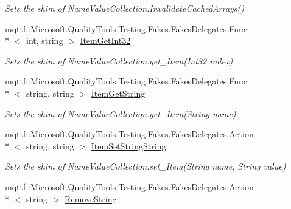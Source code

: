 \begin{DoxyCompactItemize}
\begin{DoxyCompactList}\small\item\em Sets the shim of Name\-Value\-Collection.\-Invalidate\-Cached\-Arrays()\end{DoxyCompactList}\item 
mqttf\-::\-Microsoft.\-Quality\-Tools.\-Testing.\-Fakes.\-Fakes\-Delegates.\-Func\\*
$<$ int, string $>$ \hyperlink{class_system_1_1_collections_1_1_specialized_1_1_fakes_1_1_shim_name_value_collection_a494ff3556795999db78086c4a188471c}{Item\-Get\-Int32}
\begin{DoxyCompactList}\small\item\em Sets the shim of Name\-Value\-Collection.\-get\-\_\-\-Item(\-Int32 index)\end{DoxyCompactList}\item 
mqttf\-::\-Microsoft.\-Quality\-Tools.\-Testing.\-Fakes.\-Fakes\-Delegates.\-Func\\*
$<$ string, string $>$ \hyperlink{class_system_1_1_collections_1_1_specialized_1_1_fakes_1_1_shim_name_value_collection_ada6cd08cbdb23009d9e8f2468682b976}{Item\-Get\-String}
\begin{DoxyCompactList}\small\item\em Sets the shim of Name\-Value\-Collection.\-get\-\_\-\-Item(\-String name)\end{DoxyCompactList}\item 
mqttf\-::\-Microsoft.\-Quality\-Tools.\-Testing.\-Fakes.\-Fakes\-Delegates.\-Action\\*
$<$ string, string $>$ \hyperlink{class_system_1_1_collections_1_1_specialized_1_1_fakes_1_1_shim_name_value_collection_afabb161561f1a03049191f31d6285410}{Item\-Set\-String\-String}
\begin{DoxyCompactList}\small\item\em Sets the shim of Name\-Value\-Collection.\-set\-\_\-\-Item(\-String name, String value)\end{DoxyCompactList}\item 
mqttf\-::\-Microsoft.\-Quality\-Tools.\-Testing.\-Fakes.\-Fakes\-Delegates.\-Action\\*
$<$ string $>$ \hyperlink{class_system_1_1_collections_1_1_specialized_1_1_fakes_1_1_shim_name_value_collection_a1fb937cffa3d93de1018363fcf38b339}{Remove\-String}

\end{DoxyCompactItemize}
